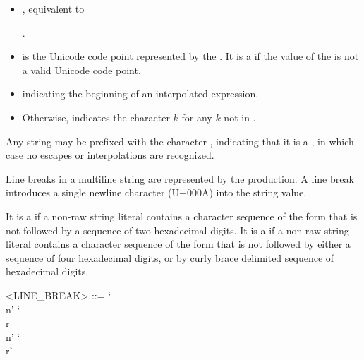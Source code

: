 \documentclass[makeidx]{article}
\begin{document}
{\begin{itemize}
  .
\item
  ,
  equivalent to

  \noindent
  .
\item
   is
  the Unicode code point represented by the
  .
  It is a  if the value of the
  is not a valid Unicode code point.
  {\color{normativeColor}}
\item
  \lit{\$} indicating the beginning of an interpolated expression.
\item
  { %
    \def\k{$k$}
    Otherwise, \syntax{`\\\k'} indicates the character \k{} for
    any \k{} not in .
  }
\end{itemize}

\LMHash{}%
Any string may be prefixed with the character ,
indicating that it is a ,
in which case no escapes or interpolations are recognized.

\LMHash{}%
Line breaks in a multiline string are represented by
the  production.
A line break introduces a single newline character (U+000A)
into the string value.

\LMHash{}%
It is a  if a non-raw string literal contains
a character sequence of the form  that is not followed by
a sequence of two hexadecimal digits.
It is a  if a non-raw string literal contains
a character sequence of the form  that is not followed by
either a sequence of four hexadecimal digits,
or by curly brace delimited sequence of hexadecimal digits.

\begin{grammar}
<LINE\_BREAK> ::= `\\n'
  \alt `\\r\\n'
  \alt `\\r'
\end{grammar}

}
\end{document}
